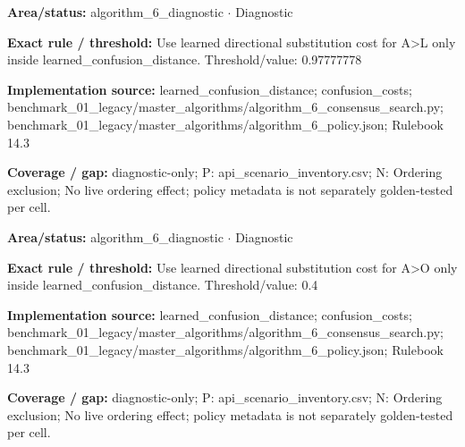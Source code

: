 \begin{tcolorbox}[enhanced,breakable,colback=white,colframe=Muted!45,boxrule=0.45pt,arc=1.5pt,left=6pt,right=6pt,top=5pt,bottom=5pt,title={\texttt{A6-LEARNED-SUBSTITUTION-A-L}},title after break={\texttt{A6-LEARNED-SUBSTITUTION-A-L}\ (continued)},fonttitle=\headingfont\bfseries\color{Navy},coltitle=Navy]
\textbf{Area/status:} algorithm\_\allowbreak{}6\_\allowbreak{}diagnostic $\boldsymbol{\cdot}$ Diagnostic\par
\smallskip
\textbf{Exact rule / threshold:} Use learned directional substitution cost for A>L only inside learned\_\allowbreak{}confusion\_\allowbreak{}distance. Threshold/\allowbreak{}value: 0.97777778\par
\smallskip
\textbf{Implementation source:} learned\_\allowbreak{}confusion\_\allowbreak{}distance; confusion\_\allowbreak{}costs; benchmark\_\allowbreak{}01\_\allowbreak{}legacy/\allowbreak{}master\_\allowbreak{}algorithms/\allowbreak{}algorithm\_\allowbreak{}6\_\allowbreak{}consensus\_\allowbreak{}search.py; benchmark\_\allowbreak{}01\_\allowbreak{}legacy/\allowbreak{}master\_\allowbreak{}algorithms/\allowbreak{}algorithm\_\allowbreak{}6\_\allowbreak{}policy.json; Rulebook 14.3\par
\smallskip
\textbf{Coverage / gap:} diagnostic-only; P: api\_\allowbreak{}scenario\_\allowbreak{}inventory.csv; N: Ordering exclusion; No live ordering effect; policy metadata is not separately golden-tested per cell.
\end{tcolorbox}
\begin{tcolorbox}[enhanced,breakable,colback=white,colframe=Muted!45,boxrule=0.45pt,arc=1.5pt,left=6pt,right=6pt,top=5pt,bottom=5pt,title={\texttt{A6-LEARNED-SUBSTITUTION-A-O}},title after break={\texttt{A6-LEARNED-SUBSTITUTION-A-O}\ (continued)},fonttitle=\headingfont\bfseries\color{Navy},coltitle=Navy]
\textbf{Area/status:} algorithm\_\allowbreak{}6\_\allowbreak{}diagnostic $\boldsymbol{\cdot}$ Diagnostic\par
\smallskip
\textbf{Exact rule / threshold:} Use learned directional substitution cost for A>O only inside learned\_\allowbreak{}confusion\_\allowbreak{}distance. Threshold/\allowbreak{}value: 0.4\par
\smallskip
\textbf{Implementation source:} learned\_\allowbreak{}confusion\_\allowbreak{}distance; confusion\_\allowbreak{}costs; benchmark\_\allowbreak{}01\_\allowbreak{}legacy/\allowbreak{}master\_\allowbreak{}algorithms/\allowbreak{}algorithm\_\allowbreak{}6\_\allowbreak{}consensus\_\allowbreak{}search.py; benchmark\_\allowbreak{}01\_\allowbreak{}legacy/\allowbreak{}master\_\allowbreak{}algorithms/\allowbreak{}algorithm\_\allowbreak{}6\_\allowbreak{}policy.json; Rulebook 14.3\par
\smallskip
\textbf{Coverage / gap:} diagnostic-only; P: api\_\allowbreak{}scenario\_\allowbreak{}inventory.csv; N: Ordering exclusion; No live ordering effect; policy metadata is not separately golden-tested per cell.
\end{tcolorbox}
